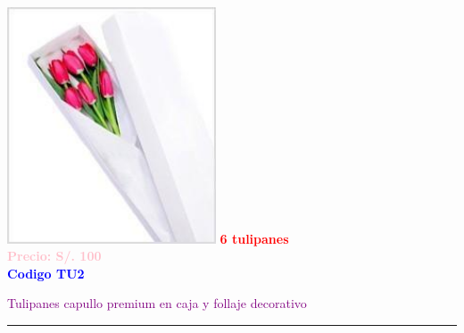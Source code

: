\begin{multicols}{2}
    \begin{minipage}{\linewidth}
        \centering
        \includegraphics[height=7cm]{imagenes_extraidas/image_2_4} %
        \newline
        \vspace{0.1cm}
        \textbf{\Large \textcolor{red}{6 tulipanes}} \\ %
        \vspace{0.2cm}
        \textbf{\textcolor{pink}{Precio: S/. 100}} \\ %
        \vspace{0.2cm}
        \textbf{\textcolor{blue}{Codigo TU2}} \\ %
        \vspace{0.2cm}
        \begin{minipage}{0.8\linewidth} 
            \small \textcolor{purple}{Tulipanes capullo premium en caja y follaje decorativo} %
        \end{minipage}
        \vspace{0.1cm}        
        \rule{\linewidth}{0.5pt}
    \end{minipage}
    

\end{multicols}
